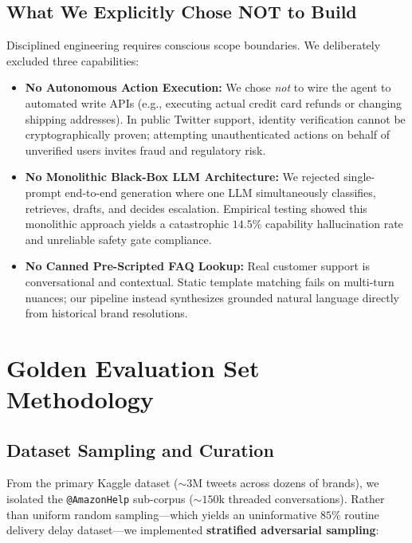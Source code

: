 \documentclass[10pt,twocolumn,a4paper]{article}
\begin{document}
\subsection{What We Explicitly Chose NOT to Build}
Disciplined engineering requires conscious scope boundaries.
We deliberately excluded three capabilities:

\begin{itemize}
  \item \textbf{No Autonomous Action Execution:} We chose \textit{not}
        to wire the agent to automated write APIs (e.g., executing
        actual credit card refunds or changing shipping addresses).
        In public Twitter support, identity verification cannot be
        cryptographically proven; attempting unauthenticated actions
        on behalf of unverified users invites fraud and regulatory risk.

  \item \textbf{No Monolithic Black-Box LLM Architecture:} We rejected
        single-prompt end-to-end generation where one LLM simultaneously
        classifies, retrieves, drafts, and decides escalation. Empirical
        testing showed this monolithic approach yields a catastrophic
        $14.5\%$ capability hallucination rate and unreliable safety
        gate compliance.

  \item \textbf{No Canned Pre-Scripted FAQ Lookup:} Real customer support
        is conversational and contextual. Static template matching fails
        on multi-turn nuances; our pipeline instead synthesizes grounded
        natural language directly from historical brand resolutions.
\end{itemize}

\section{Golden Evaluation Set Methodology}\label{sec:golden}

\subsection{Dataset Sampling and Curation}
From the primary Kaggle dataset (${\sim}3\text{M}$ tweets across dozens
of brands), we isolated the \texttt{@AmazonHelp} sub-corpus
(${\sim}150\text{k}$ threaded conversations). Rather than uniform random
sampling---which yields an uninformative $85\%$ routine delivery delay
dataset---we implemented \textbf{stratified adversarial sampling}:
\end{document}
